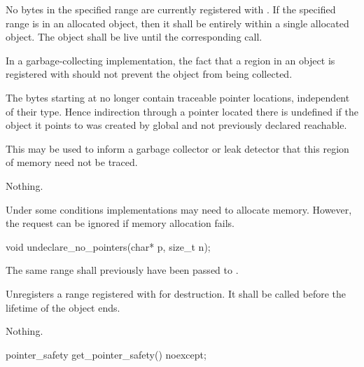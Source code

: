 \begin{itemdescr}
\pnum
\requires No bytes in the specified range
are currently registered with
. If the specified range is in an allocated object,
then it shall be entirely within a single allocated object. The object shall be
live until the corresponding  call.
\begin{note}
In
a garbage-collecting implementation, the fact that a region in an object is
registered with  should not prevent the object from
being collected.
\end{note}

\pnum
\effects
The  bytes starting at  no longer contain
traceable pointer locations, independent of their type. Hence
indirection through a pointer located there is undefined if the object
it points to was created by global  and not
previously declared reachable.
\begin{note}
This may be used to inform a
garbage collector or leak detector that this region of memory need not
be traced.
\end{note}

\pnum
\throws
Nothing.

\pnum
\begin{note}
Under some conditions implementations may need to allocate memory.
However, the request can be ignored if memory allocation fails.
\end{note}
\end{itemdescr}

%
\begin{itemdecl}
void undeclare_no_pointers(char* p, size_t n);
\end{itemdecl}

\begin{itemdescr}
\pnum
\requires The same range shall previously have been passed to
.

\pnum
\effects
Unregisters a range registered with  for
destruction. It shall be called before the lifetime of the object ends.

\pnum
\throws
Nothing.
\end{itemdescr}

%
\begin{itemdecl}
pointer_safety get_pointer_safety() noexcept;
\end{itemdecl}

